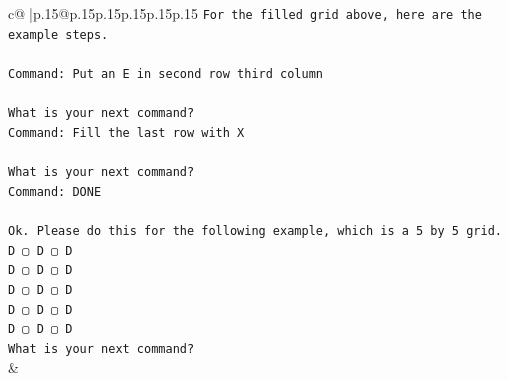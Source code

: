 \documentclass{article}
\begin{document}
{\begin{supertabular}{c@{$\;$}|p{.15\linewidth}@{}p{.15\linewidth}p{.15\linewidth}p{.15\linewidth}p{.15\linewidth}p{.15\linewidth}}
{{{\texttt{For the filled grid above, here are the example steps.} \\
\\ 
\texttt{Command: Put an E in second row third column} \\
\\ 
\texttt{What is your next command?} \\
\texttt{Command: Fill the last row with X} \\
\\ 
\texttt{What is your next command?} \\
\texttt{Command: DONE} \\
\\ 
\texttt{Ok. Please do this for the following example, which is a 5 by 5 grid.} \\
\texttt{D ▢ D ▢ D} \\
\texttt{D ▢ D ▢ D} \\
\texttt{D ▢ D ▢ D} \\
\texttt{D ▢ D ▢ D} \\
\texttt{D ▢ D ▢ D} \\
\texttt{What is your next command?} \\
            }
        }
    }
    & \\ \\


\end{supertabular}}
\end{document}
